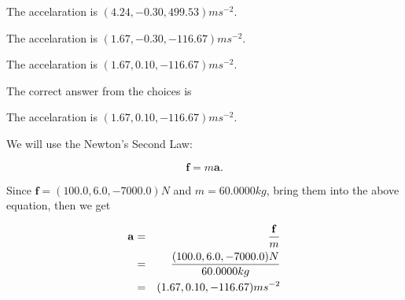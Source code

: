 \documentclass[12pt]{article}
\begin{document}
 
The accelaration is $  %
(
4.24,
-0.30,
499.53)
ms^{-2} $.
 
 
The accelaration is $  %
(
1.67,
-0.30,
-116.67)
ms^{-2} $.
 
 
\noindent{}
 
 
The accelaration is $  %
(
1.67,
0.10,
-116.67)
ms^{-2} $.
 
 
\noindent{}
 
 
 
 
 
\noindent{}
 
 

The correct answer from the choices is


The accelaration is $  %
(
1.67,
0.10,
-116.67)
ms^{-2} $.
 
 
 
\noindent{}
 
 

 
 
 
\noindent{}
 
 

We will use the Newton's Second Law:
 
\[
\mathbf{f}=m\mathbf{a}.
\]
 
Since $\mathbf{f}= %
(100.0 , 6.0 , -7000.0) N$
and $m= %
60.0000kg$, bring them into the above equation, then we get
 
\begin{eqnarray*}
\mathbf{a}&=&\frac{\mathbf{f}}m  \\
&=&\frac{ %
(100.0 , 6.0 , -7000.0) N}{ %
60.0000kg}  \\
&=& %
(1.67 , 0.10 , -116.67) ms^{-2}
\end{eqnarray*}
 
 
 
\noindent{}
 
 

 
\vspace{0.3in}
   
\end{document}
